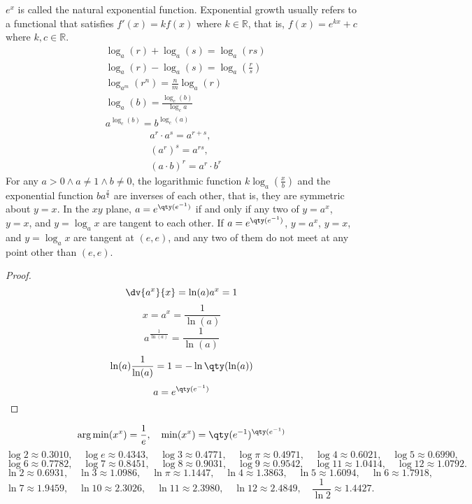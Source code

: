 \documentclass[a4paper,12pt]{article}
\begin{document}
$e^x$ is called the natural exponential function.
Exponential growth usually refers to a functional that satisfies $f'(x)=kf(x)$ where $k\in\mathbb{R}$, that is, $f(x)=e^{kx}+c$ where $k,c\in\mathbb{R}$.
\[\begin{aligned}
& \log_a(r)+\log_a(s)=\log_a(rs)\\
& \log_a(r)-\log_a(s)=\log_a\left(\frac{r}{s}\right)\\
& \log_{a^m}(r^n)=\frac{n}{m}\log_a(r)\\
& \log_a(b)=\frac{\log_c(b)}{\log_c{a}}\\
& a^{\log_c(b)}=b^{\log_c(a)}
\end{aligned}\]
\[\begin{aligned}
& a^r\cdot a^s=a^{r+s},\\
& (a^r)^s=a^{rs},\\
& (a\cdot b)^r=a^r\cdot b^r
\end{aligned}\]
For any $a>0\land a\neq 1\land b\neq 0$, the logarithmic function $k\log_a\left(\frac{x}{b}\right)$ and the exponential function $ba^{\frac{x}{k}}$ are inverses of each other, that is, they are symmetric about $y=x$.
In the $xy$ plane, $a=e^{\qty(e^{-1})}$ if and only if any two of $y=a^x$, $y=x$, and $y=\log_ax$ are tangent to each other. If $a=e^{\qty(e^{-1})}$, $y=a^x$, $y=x$, and $y=\log_ax$ are tangent at $(e,e)$, and any two of them do not meet at any point other than $(e,e)$.
\begin{proof}
\[\dv{a^x}{x}=\ln(a)a^x=1\]
\[x=a^x=\frac{1}{\ln(a)}\]
\[a^{\frac{1}{\ln(a)}}=\frac{1}{\ln(a)}\]
\[\ln(a)\frac{1}{\ln(a)}=1=-\ln\qty(\ln(a))\]
\[a=e^{\qty(e^{-1})}\]
\end{proof}
\[\arg\min(x^x)=\frac{1}{e},\quad\min(x^x)=\qty(e^{-1})^{\qty(e^{-1})}\]
\[\log 2\approx 0.3010,\quad\log e\approx 0.4343,\quad\log 3\approx 0.4771,\quad\log\pi\approx 0.4971,\quad\log 4\approx 0.6021,\quad\log 5\approx 0.6990,\]
\[\log 6\approx 0.7782,\quad\log 7\approx 0.8451,\quad\log 8\approx 0.9031,\quad\log 9\approx 0.9542,\quad\log 11\approx 1.0414,\quad\log 12\approx 1.0792.\]
\[\ln 2\approx 0.6931,\quad\ln 3\approx 1.0986,\quad\ln\pi\approx 1.1447,\quad\ln 4\approx 1.3863,\quad\ln 5\approx 1.6094,\quad\ln 6\approx 1.7918,\]
\[\ln 7\approx 1.9459,\quad\ln 10\approx 2.3026,\quad\ln 11\approx 2.3980,\quad\ln 12\approx 2.4849,\quad\frac{1}{\ln 2}\approx 1.4427.\]
\end{document}
